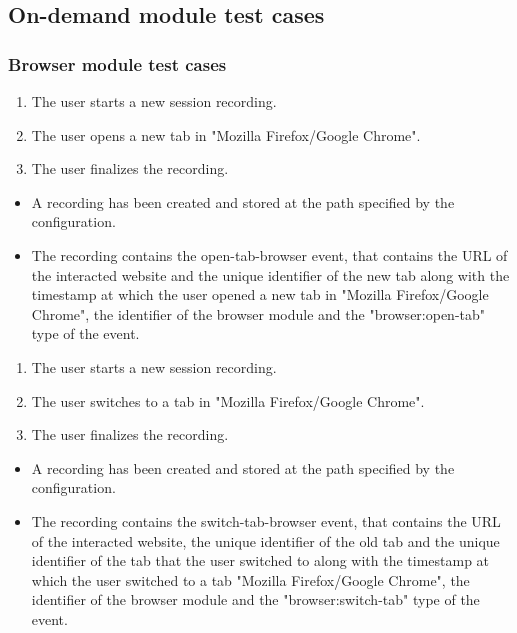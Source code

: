\subsection{On-demand module test cases}

\subsubsection{Browser module test cases}
\begin{tests}
	{\begin{enumerate}
		\item The \gls{user} starts a new \gls{session} recording.
		\item The \gls{user} opens a new tab in "Mozilla Firefox/Google Chrome".
		\item The \gls{user} finalizes the recording.
	\end{enumerate}}
	{\begin{itemize}
		\item A recording has been created and stored at the path specified by the configuration.
		\item The recording contains the open-tab-browser \gls{event},  that contains the URL of the interacted website and the unique identifier of the new tab along with the timestamp at which the \gls{user} opened a new tab in "Mozilla Firefox/Google Chrome", the identifier of the \gls{browser} module and the "browser:open-tab" type of the event.
	\end{itemize}}
	
	{\begin{enumerate}
		\item The \gls{user} starts a new \gls{session} recording.
		\item The \gls{user} switches to a tab in "Mozilla Firefox/Google Chrome".
		\item The \gls{user} finalizes the recording.
	\end{enumerate}}
	{\begin{itemize}
		\item A recording has been created and stored at the path specified by the configuration.
		\item The recording contains the switch-tab-browser \gls{event},  that contains the URL of the interacted website, the unique identifier of the old tab and the unique identifier of the tab that the \gls{user} switched to along with the timestamp at which the \gls{user} switched to a tab "Mozilla Firefox/Google Chrome", the identifier of the \gls{browser} module and the "browser:switch-tab" type of the event.
	\end{itemize}}
	

\end{tests}
